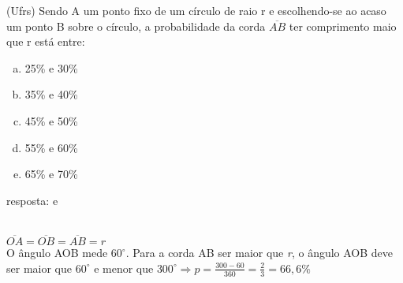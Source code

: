 \begin{ex}
(Ufrs) Sendo A um ponto fixo de um círculo de raio r e escolhendo-se ao acaso um ponto B sobre o círculo, a probabilidade da corda $\overline {AB}$  ter comprimento maio que r está entre:
   \begin{enumerate}[(a)]
   \item 25\% e 30\%
   \item 35\% e 40\%
   \item 45\% e 50\%
   \item 55\% e 60\%
   \item 65\% e 70\%
   \end{enumerate}
     \begin{sol}
      resposta: e \\ \\
      $\overline{OA}=\overline{OB}=\overline{AB}=r$ \\
      O ângulo AOB mede $60^{\circ}$. Para a corda AB ser maior que \textit{r}, o ângulo AOB deve ser maior que $60^{\circ}$ e menor que $300^{\circ} \Longrightarrow p= \frac{300-60}{360}=\frac{2}{3}=66,6\%$
     
     \end{sol}
\end{ex}